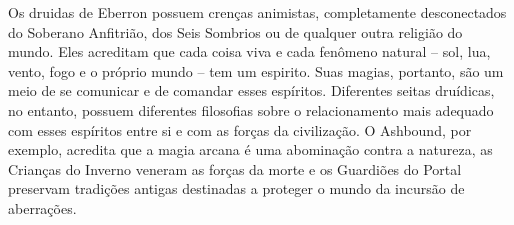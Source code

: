 \documentclass[a4paper,12p]{book}
\begin{document}
\begin{multicols}{2}
			Os druidas de Eberron possuem crenças animistas, completamente desconectados do Soberano Anfitrião, dos Seis Sombrios ou de qualquer outra religião do mundo. Eles acreditam que cada coisa viva e cada fenômeno natural – sol, lua, vento, fogo e o próprio mundo – tem um espirito. Suas magias, portanto, são um meio de se comunicar e de comandar esses espíritos. Diferentes seitas druídicas, no entanto, possuem diferentes filosofias sobre o relacionamento mais adequado com esses espíritos entre si e com as forças da civilização. O Ashbound, por exemplo, acredita que a magia arcana é uma abominação contra a natureza, as Crianças do Inverno veneram as forças da morte e os Guardiões do Portal preservam tradições antigas destinadas a proteger o mundo da incursão de aberrações.
			
			
			\vfill\null
		\end{multicols}
	\pagebreak
\end{document}
